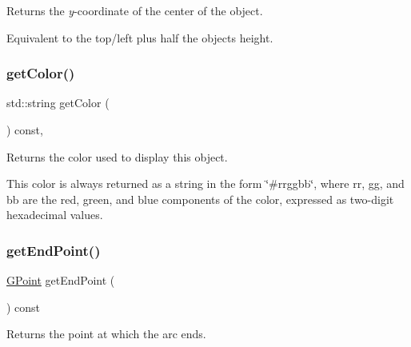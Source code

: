 Returns the {\itshape y}-\/coordinate of the center of the object. 

Equivalent to the top/left plus half the object\textquotesingle{}s height. \mbox{\label{classsgl_1_1GObject_aa061dfa488c31e18549d64363c1d0e34}} 
\subsubsection{\texorpdfstring{get\+Color()}{getColor()}}
{\footnotesize\ttfamily std\+::string get\+Color (\begin{DoxyParamCaption}{ }\end{DoxyParamCaption}) const\hspace{0.3cm}{\ttfamily [virtual]}, {\ttfamily [inherited]}}



Returns the color used to display this object. 

This color is always returned as a string in the form {\ttfamily \char`\"{}\#rrggbb\char`\"{}}, where {\ttfamily rr}, {\ttfamily gg}, and {\ttfamily bb} are the red, green, and blue components of the color, expressed as two-\/digit hexadecimal values. \mbox{\label{classsgl_1_1GArc_a835d5e50bf4a91efcf0d838130c246af}} 
\subsubsection{\texorpdfstring{get\+End\+Point()}{getEndPoint()}}
{\footnotesize\ttfamily \mbox{\hyperlink{structsgl_1_1GPoint}{G\+Point}} get\+End\+Point (\begin{DoxyParamCaption}{ }\end{DoxyParamCaption}) const\hspace{0.3cm}{\ttfamily [virtual]}}



Returns the point at which the arc ends. 

\mbox{\label{classsgl_1_1GObject_a76f6964a11fde7c78e9751be184e1a3c}} 
